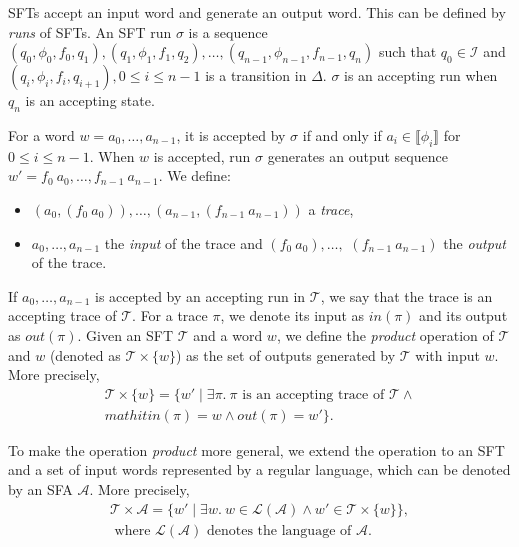 \documentclass[sigplan,10pt,anonymous,review]{acmart}\settopmatter{printfolios=true,printccs=false,printacmref=false}
\begin{document}
SFTs accept an input word and generate an output word. This can be defined by \emph{runs} of SFTs.
An SFT run $\sigma$ is a sequence $(q_0, \phi_0, f_0, q_1),(q_1, \phi_1, f_1, q_2),\ldots, (q_{n-1}, \phi_{n-1}, f_{n-1}, q_n)$ such that $q_0\in \mathcal{I}$ and $(q_i,
\phi_i, f_i, q_{i+1}), 0 \leq i \leq n-1$ is a transition in $\Delta$.
$\sigma$ is an accepting run when $q_n$ is an accepting state.

For a word $w = a_0,\ldots, a_{n-1}$, it is accepted by $\sigma$ if and only if $a_i \in \llbracket\phi_i \rrbracket$ for $0 \leq i \leq n - 1$. When $w$ is accepted, run $\sigma$ generates an output sequence $w'= f_0~a_0, \ldots, f_{n-1}~a_{n-1}$. We define:
\begin{itemize}
\item  $(a_0,(f_0~a_0)), \ldots, (a_{n-1},(f_{n-1}~a_{n-1}))$ a \emph{trace},
\item $a_0,\ldots,a_{n-1}$ the \emph{input} of the trace and $(f_0~a_0), \ldots, $ $(f_{n-1}~a_{n-1})$ the \emph{output} of the trace.
\end{itemize}

If $a_0,\ldots,a_{n-1}$ is accepted by an accepting run in $\mathcal{T}$, we say that the trace is an accepting trace of $\mathcal{T}$.
For a trace $\pi$, we denote its input as $\mathit{in}(\pi)$ and its output as $\mathit{out}(\pi)$.
%
Given an SFT $\mathcal{T}$ and a word $w$, we define the \emph{product} operation of $\mathcal{T}$ and $w$ (denoted as $\mathcal{T}\times\{w\}$) as the set of outputs generated by $\mathcal{T}$ with input $w$. More precisely,
\[
\begin{split}
\mathcal{T}\times\{w\} = \{w'\mid \exists \pi.~\pi \text{ is an accepting trace of } \mathcal{T} \land \\mathit{in}(\pi) = w \land \mathit{out}(\pi) = w'\}.
\end{split}
\]

To make the operation \emph{product} more general, we extend the operation to an SFT and a set of input words represented by a regular language, which can be denoted by an SFA $\mathcal{A}$. More precisely,
\[
\begin{split}
\mathcal{T}\times \mathcal{A} = \{w'\mid \exists w.~w\in \mathcal{L}(\mathcal{A})\land w' \in \mathcal{T}\times\{w\}\}, \\\text{ where }\mathcal{L}(\mathcal{A})\text{ denotes the language of }\mathcal{A}.
\end{split}
\]
\end{document}
